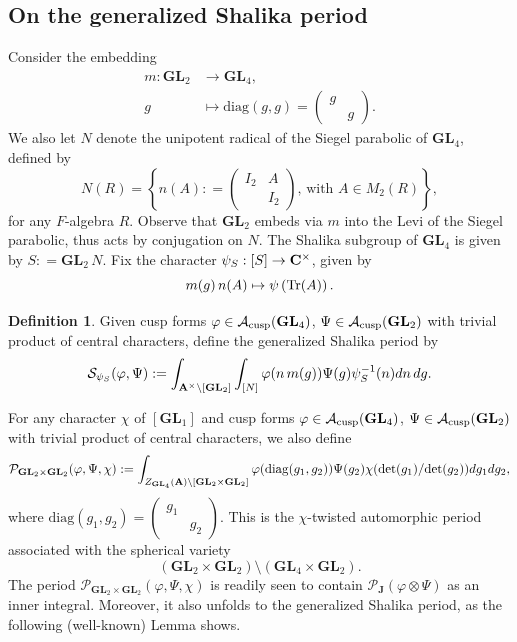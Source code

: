 \documentclass[11pt, reqno]{amsart}
\theoremstyle{plain}
\theoremstyle{definition}
\newtheorem{definition}[theorem]{Definition}
\theoremstyle{remark}
\theoremstyle{plain}
\def\C{{\bf C}}
\def\A{{\bf A}}
\def\GL{\mathbf{GL}}
\begin{document}
\subsection{On the generalized Shalika period}\label{Shalika_period_subsec}
Consider the embedding 
\begin{align*}
    m: \GL_2 &\to \GL_4,\\
    g &\mapsto  \mathrm{diag}(g,g) = \left(\begin{smallmatrix}
        g& \\ &g\end{smallmatrix}\right).
\end{align*}
We also let $N$ denote the unipotent radical of the Siegel parabolic of $\GL_4$, defined by 
$$ N(R) = \left \{n(A) : =  \left(\begin{smallmatrix}
    I_2 & A \\ & I_2
\end{smallmatrix} \right),\, \text{with }A \in M_{2}(R) \right\},$$
for any $F$-algebra $R$. Observe that $\GL_2$ embeds via $m$ into the Levi of the Siegel parabolic, thus acts by conjugation on $N$. The Shalika subgroup of $\GL_4$ is given by $S : = \GL_2 \,  N$. Fix the character $\psi_S: [S] \to \C^\times$, given by \[ m(g)\, n(A) \mapsto \psi\left({\rm Tr}(A)\right).  \]

\begin{definition}\label{definition_shalika_generalized}
   Given cusp forms $\varphi \in \mathcal{A}_{{\rm cusp}}(\GL_4)$, $\Psi \in \mathcal{A}_{{\rm cusp}}(\GL_2)$ with trivial product of central characters, define the generalized Shalika period by
   \[\mathcal{S}_{\psi_S}({\varphi,\Psi}):= \int_{\A^\times \backslash[\GL_2]} \int_{[N]}  \varphi(n\, m(g))\Psi(g) \psi_S^{-1}(n) dn\,dg.\]
\end{definition}

For any character $\chi$ of $[\GL_1]$ and cusp forms $\varphi \in \mathcal{A}_{{\rm cusp}}(\GL_4)$, $\Psi \in \mathcal{A}_{{\rm cusp}}(\GL_2)$ with trivial product of central characters, we also define 
\[\mathcal{P}_{\GL_2\times\GL_2}(\varphi,\Psi,\chi) := \int_{Z_{\GL_4}(\A)\backslash[\GL_2\times \GL_2]}\varphi(\mathrm{diag}(g_1,g_2))\Psi(g_2)\chi(\mathrm{det}(g_1)/\mathrm{det}(g_2))dg_1dg_2,\]
where $\mathrm{diag}(g_1,g_2) = \left(\begin{smallmatrix}
        g_1& \\ &g_2\end{smallmatrix}\right)$. This is the $\chi$-twisted automorphic period associated with the spherical variety   \[(\GL_2\times \GL_2)\setminus (\GL_4\times \GL_2).\]
The period $\mathcal{P}_{\GL_2\times\GL_2}(\varphi,\Psi,\chi)$ is readily seen to contain $\mathcal{P}_{\mathbf{J}}(\varphi\otimes\Psi)$ as an inner integral. Moreover, it also unfolds to the generalized Shalika period, as the following (well-known) Lemma shows.
\end{document}

